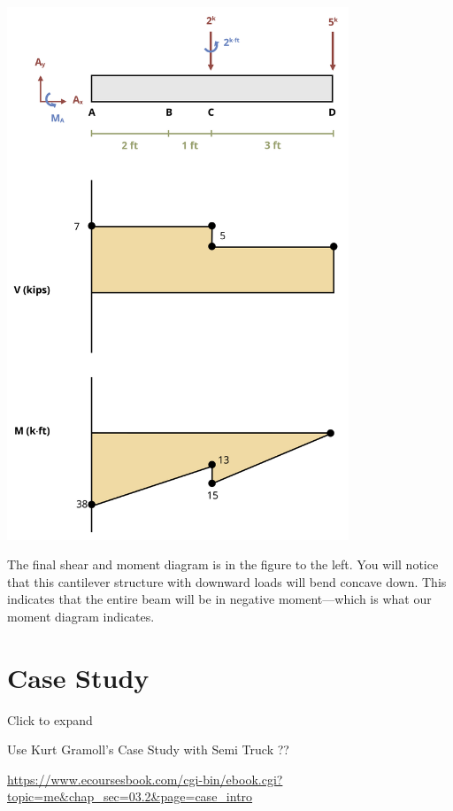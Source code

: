 \documentclass[
  letterpaper,
  DIV=11,
  numbers=noendperiod]{scrreprt}
\begin{document}
\begin{tcolorbox}
\begin{center}
\includegraphics[width=4.02083in,height=\textheight]{images/CH7 PNGs/example 7.4 part 7.png}
\end{center}

The final shear and moment diagram is in the figure to the left. You
will notice that this cantilever structure with downward loads will bend
concave down. This indicates that the entire beam will be in negative
moment---which is what our moment diagram indicates.

\end{tcolorbox}

\section*{Case Study}\label{case-study}


Click to expand

Use Kurt Gramoll's Case Study with Semi Truck ??

\url{https://www.ecoursesbook.com/cgi-bin/ebook.cgi?topic=me&chap_sec=03.2&page=case_intro}
\end{document}
